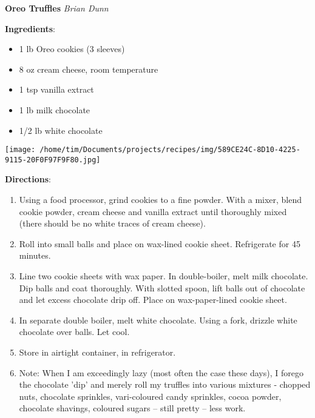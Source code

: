 \documentclass[11pt, twoside, openany]{book}
\begin{document}
\noindent\begin{minipage}[t]{\linewidth}%
{\Large\textbf{Oreo Truffles}} \label{oreo-truffles}\hfill\textit{Brian Dunn}\\
\noindent\begin{minipage}[t]{0.78\linewidth}%
\textbf{Ingredients}:\vspace{-3mm}
\begin{multicols}{2}
\begin{itemize}\setlength\itemsep{-1mm}
\item 1 lb Oreo cookies (3 sleeves)
\item 8 oz cream cheese, room temperature
\item 1 tsp vanilla extract
\item 1 lb milk chocolate
\item 1/2 lb white chocolate
\end{itemize}
\end{multicols}
\end{minipage}
\noindent\begin{minipage}[t]{0.18\linewidth}
\centering \strut\vspace*{-\baselineskip}\newline
\texttt{[image: /home/tim/Documents/projects/recipes/img/589CE24C-8D10-4225-9115-20F0F97F9F80.jpg]}\\
\end{minipage}\vspace{3mm}
\textbf{Directions}:
\vspace{-3mm}\begin{enumerate}\setlength\itemsep{-1mm}
\item Using a food processor, grind cookies to a fine powder. With a mixer, blend cookie powder, cream cheese and vanilla extract until thoroughly mixed (there should be no white traces of cream cheese).
\item Roll into small balls and place on wax-lined cookie sheet. Refrigerate for 45 minutes.
\item Line two cookie sheets with wax paper. In double-boiler, melt milk chocolate. Dip balls and coat thoroughly. With slotted spoon, lift balls out of chocolate and let excess chocolate drip off. Place on wax-paper-lined cookie sheet.
\item In separate double boiler, melt white chocolate. Using a fork, drizzle white chocolate over balls. Let cool.
\item Store in airtight container, in refrigerator.
\item Note: When I am exceedingly lazy (most often the case these days), I forego the chocolate 'dip' and merely roll my truffles into various mixtures - chopped nuts, chocolate sprinkles, vari-coloured candy sprinkles, cocoa powder, chocolate shavings, coloured sugars -- still pretty -- less work.
\end{enumerate}
\end{minipage}\vspace{8mm}
\end{document}
